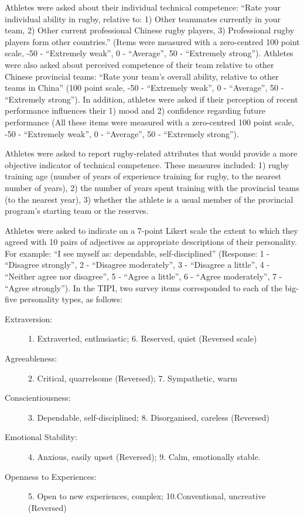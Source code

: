 Athletes were asked about their individual technical competence: ``Rate your individual ability in rugby, relative to: 1) Other teammates currently in your team, 2) Other current professional Chinese rugby players, 3) Professional rugby players form other countries.'' (Items were measured with a zero-centred 100 point scale, -50 - ``Extremely weak'', 0 - ``Average'', 50 - ``Extremely strong'').  Athletes were also asked about perceived competence of their team relative to other Chinese provincial teams: ``Rate your team's overall ability, relative to other teams in China'' (100 point scale, -50 - ``Extremely weak'', 0 - ``Average'', 50 - ``Extremely strong'').  In addition, athletes were asked if their perception of recent performance influences their 1) mood and 2) confidence regarding future performance (All these items were measured with a zero-centred 100 point scale, -50 - ``Extremely weak'', 0 - ``Average'', 50 - ``Extremely strong'').

Athletes were asked to report rugby-related attributes that would provide a more objective indicator of technical competence. These measures included: 1) rugby training age (number of years of experience training for rugby, to the nearest number of years), 2) the number of years spent training with the provincial teams (to the nearest year), 3) whether the athlete is a usual member of the provincial program's starting team or the reserves.


Athletes were asked to indicate on a 7-point Likert scale the extent to which they agreed with 10 pairs of adjectives as appropriate descriptions of their personality. For example: ``I see myself as: dependable, self-disciplined'' (Response: 1 - ``Disagree strongly'', 2 - ``Disagree moderately'',  3 - ``Disagree a little'', 4 - ``Neither agree nor disagree'', 5 - ``Agree a little'', 6 - ``Agree moderately'', 7 - ``Agree strongly''). In the TIPI, two survey items corresponded to each of the big-five personality types, as follows:

\begin{description}
\item [Extraversion:] 1. Extraverted, enthusiastic; 6. Reserved, quiet (Reversed scale)
\item [Agreeableness:] 2. Critical, quarrelsome (Reversed); 7. Sympathetic, warm
\item [Conscientiousness:] 3. Dependable, self-disciplined; 8. Disorganised, careless (Reversed)
\item [Emotional Stability:] 4. Anxious, easily upset (Reversed); 9. Calm, emotionally stable.
\item [Openness to Experiences:] 5. Open to new experiences, complex; 10.Conventional, uncreative (Reversed)
\end{description}



